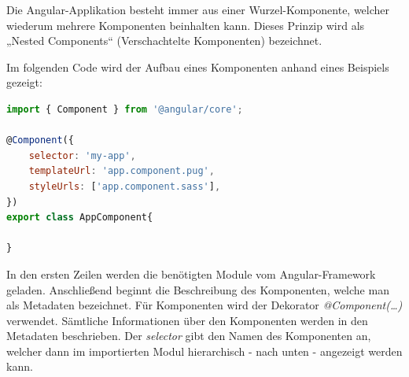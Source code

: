 Die Angular-Applikation besteht immer aus einer Wurzel-Komponente, welcher wiederum mehrere Komponenten beinhalten kann. Dieses Prinzip wird als „Nested Components“ (Verschachtelte Komponenten) bezeichnet.

Im folgenden Code wird der Aufbau eines Komponenten anhand eines Beispiels gezeigt:

\begin{lstlisting}[language=javascript]
import { Component } from '@angular/core';

@Component({
	selector: 'my-app',
	templateUrl: 'app.component.pug',
	styleUrls: ['app.component.sass'],
})
export class AppComponent{

}
\end{lstlisting}
\lstset{escapechar=@,style=customjava}

In den ersten Zeilen werden die benötigten Module vom Angular-Framework geladen. Anschließend beginnt die Beschreibung des Komponenten, welche man als Metadaten bezeichnet. Für Komponenten wird der Dekorator \textit{@Component({…})} verwendet.
Sämtliche Informationen über den Komponenten werden in den Metadaten beschrieben. Der \textit{selector} gibt den Namen des Komponenten an, welcher dann im importierten Modul hierarchisch - nach unten - angezeigt werden kann. 


